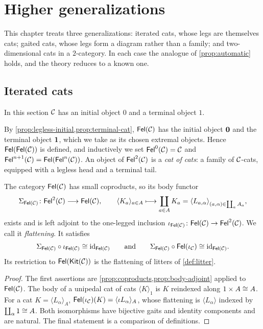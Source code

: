 \chapter{Higher generalizations}\label{ch:higher}

This chapter treats three generalizations: iterated cats, whose legs are
themselves cats; gaited cats, whose legs form a diagram rather than a family;
and two-dimensional cats in a $2$-category. In each case the analogue of
\cref{prop:automatic} holds, and the theory reduces to a known one.

\section{Iterated cats}\label{sec:iterated}

\begin{assumption}\label{ass:iterated}
In this section $\mathcal{C}$ has an initial object $0$ and a terminal object $1$.
\end{assumption}

By \cref{prop:legless-initial,prop:terminal-cat}, $\mathsf{Fel}(\mathcal{C})$ has the initial
object $\mathbf{0}$ and the terminal object $\mathbf{1}$, which we take as its chosen
extremal objects. Hence $\mathsf{Fel}(\mathsf{Fel}(\mathcal{C}))$ is defined, and inductively we set
$\mathsf{Fel}^0(\mathcal{C})=\mathcal{C}$ and $\mathsf{Fel}^{n+1}(\mathcal{C})=\mathsf{Fel}(\mathsf{Fel}^n(\mathcal{C}))$. An object of
$\mathsf{Fel}^2(\mathcal{C})$ is a \emph{cat of cats}: a family of $\mathcal{C}$-cats, equipped with a
legless head and a terminal tail.

\begin{proposition}\label{prop:flattening}
The category $\mathsf{Fel}(\mathcal{C})$ has small coproducts, so its body functor
\[
\Sigma_{\mathsf{Fel}(\mathcal{C})}\colon\mathsf{Fel}^2(\mathcal{C})\longrightarrow\mathsf{Fel}(\mathcal{C}),\qquad
\langle K_a\rangle_{a\in A}\longmapsto\coprod_{a\in A}K_a=\langle L_{a,\alpha}\rangle_{(a,\alpha)\in\coprod_aA_a},
\]
exists and is left adjoint to the one-legged inclusion
$\iota_{\mathsf{Fel}(\mathcal{C})}\colon\mathsf{Fel}(\mathcal{C})\to\mathsf{Fel}^2(\mathcal{C})$. We call it \emph{flattening}.
It satisfies
\[
\Sigma_{\mathsf{Fel}(\mathcal{C})}\circ\iota_{\mathsf{Fel}(\mathcal{C})}\cong\mathrm{id}_{\mathsf{Fel}(\mathcal{C})}\qquad\text{and}\qquad
\Sigma_{\mathsf{Fel}(\mathcal{C})}\circ\mathsf{Fel}(\iota_{\mathcal{C}})\cong\mathrm{id}_{\mathsf{Fel}(\mathcal{C})}.
\]
Its restriction to $\mathsf{Fel}(\mathsf{Kit}(\mathcal{C}))$ is the flattening of litters of
\cref{def:litter}.
\end{proposition}

\begin{proof}
The first assertions are \cref{prop:coproducts,prop:body-adjoint} applied to
$\mathsf{Fel}(\mathcal{C})$. The body of a unipedal cat of cats $\langle K\rangle_1$ is
$K$ reindexed along $1\times A\cong A$. For a cat $K=\langle L_\alpha\rangle_A$,
$\mathsf{Fel}(\iota_{\mathcal{C}})(K)=\langle\iota L_\alpha\rangle_A$, whose flattening is
$\langle L_\alpha\rangle$ indexed by $\coprod_\alpha1\cong A$. Both isomorphisms
have bijective gaits and identity components and are natural. The final
statement is a comparison of definitions.
\end{proof}

